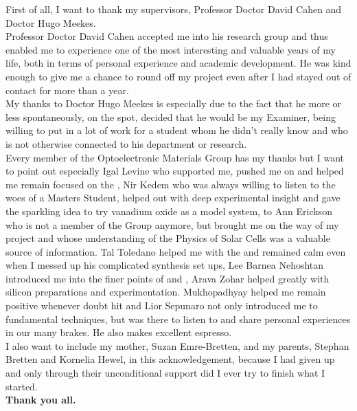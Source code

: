 
\begin{acknowledgements}
\addchaptertocentry{\acknowledgementname} %

First of all, I want to thank my supervisors, Professor Doctor David Cahen and Doctor Hugo Meekes.\\
Professor Doctor David Cahen accepted me into his research group and thus enabled me to experience one of the most interesting and valuable years of my life, both in terms of personal experience and academic development. He was kind enough to give me a chance to round off my project even after I had stayed out of contact for more than a year.\\
My thanks to Doctor Hugo Meekes is especially due to the fact that he more or less spontaneously, on the spot, decided that he would be my Examiner, being willing to put in a lot of work for a student whom he didn't really know and who is not otherwise connected to his department or research.\\
Every member of the Optoelectronic Materials Group has my thanks but I want to point out especially Igal Levine who supported me, pushed me on and helped me remain focused on the \McA{}, Nir Kedem who was always willing to listen to the woes of a Masters Student, helped out with deep experimental insight and gave the sparkling idea to try vanadium oxide as a model system, to Ann Erickson who is not a member of the Group anymore, but brought me on the way of my project and whose understanding of the Physics of Solar Cells was a valuable source of information. Tal Toledano helped me with the \ftir{} and remained calm even when I messed up his complicated synthesis set ups, Lee Barnea Nehoshtan introduced me into the finer points of \cpd{} and \spv{}, Arava Zohar helped greatly with silicon preparations and  experimentation.  Mukhopadhyay helped me remain positive whenever doubt hit and Lior Sepunaro not only introduced me to fundamental techniques, but was there to listen to and share personal experiences in our many brakes. He also makes excellent espresso.\\
I also want to include my mother, Suzan Emre-Bretten, and my parents, Stephan Bretten and Kornelia Hewel, in this acknowledgement, because I had given up and only through their unconditional support did I ever try to finish what I started.\\
\textbf{Thank you all.}

\end{acknowledgements}
